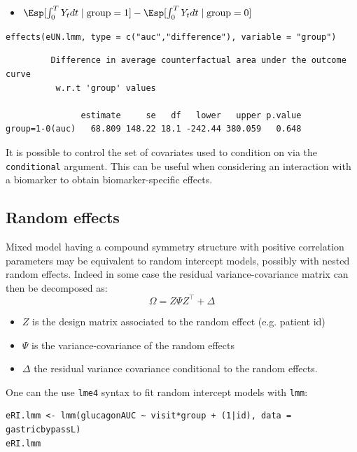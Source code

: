 \documentclass[12pt]{article}
\newcommand\trans[1]{{#1}^\intercal}%
\begin{document}
\begin{itemize}
\item \(\Esp[\int_0^T Y_t dt \mid \text{group}=1]-\Esp[\int_0^T Y_t dt \mid \text{group}=0]\)
\end{itemize}
\lstset{language=r,label= ,caption= ,captionpos=b,numbers=none}
\begin{lstlisting}
effects(eUN.lmm, type = c("auc","difference"), variable = "group")
\end{lstlisting}

\begin{verbatim}
	     Difference in average counterfactual area under the outcome curve
	      w.r.t 'group' values 

               estimate     se   df   lower   upper p.value  
group=1-0(auc)   68.809 148.22 18.1 -242.44 380.059   0.648
\end{verbatim}


It is possible to control the set of covariates used to condition on
via the \texttt{conditional} argument. This can be useful when considering an
interaction with a biomarker to obtain biomarker-specific effects.

\clearpage

\subsection{Random effects}
\label{sec:org2702274}

Mixed model having a compound symmetry structure with positive
correlation parameters may be equivalent to random intercept models,
possibly with nested random effects. Indeed in some case the residual
variance-covariance matrix can then be decomposed as:
\[ \Omega = Z \Psi \trans{Z} + \Delta \]
\begin{itemize}
\item \(Z\) is the design matrix associated to the random effect (e.g. patient id)
\item \(\Psi\) is the variance-covariance of the random effects
\item \(\Delta\) the residual variance covariance conditional to the random effects.
\end{itemize}
One can the use \texttt{lme4} syntax to fit random intercept models with
\texttt{lmm}:
\lstset{language=r,label= ,caption= ,captionpos=b,numbers=none}
\begin{lstlisting}
eRI.lmm <- lmm(glucagonAUC ~ visit*group + (1|id), data = gastricbypassL)
eRI.lmm
\end{lstlisting}
\end{document}
